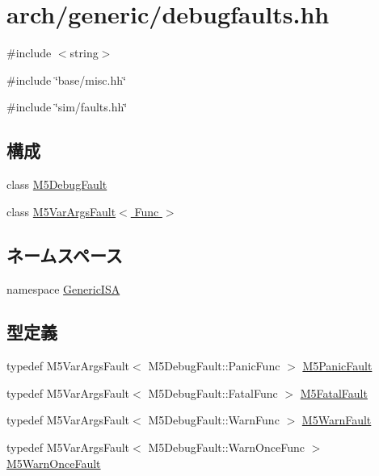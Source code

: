 \hypertarget{debugfaults_8hh}{
\section{arch/generic/debugfaults.hh}
\label{debugfaults_8hh}
}
{\ttfamily \#include $<$string$>$}\par
{\ttfamily \#include \char`\"{}base/misc.hh\char`\"{}}\par
{\ttfamily \#include \char`\"{}sim/faults.hh\char`\"{}}\par
\subsection*{構成}
\begin{DoxyCompactItemize}
\item 
class \hyperlink{classGenericISA_1_1M5DebugFault}{M5DebugFault}
\item 
class \hyperlink{classGenericISA_1_1M5VarArgsFault}{M5VarArgsFault$<$ Func $>$}
\end{DoxyCompactItemize}
\subsection*{ネームスペース}
\begin{DoxyCompactItemize}
\item 
namespace \hyperlink{namespaceGenericISA}{GenericISA}
\end{DoxyCompactItemize}
\subsection*{型定義}
\begin{DoxyCompactItemize}
\item 
typedef M5VarArgsFault$<$ M5DebugFault::PanicFunc $>$ \hyperlink{namespaceGenericISA_a3427cc78f489a7ee730b871fcb4c1960}{M5PanicFault}
\item 
typedef M5VarArgsFault$<$ M5DebugFault::FatalFunc $>$ \hyperlink{namespaceGenericISA_a7eadd3e78154f25c430d19d74ac7eb0c}{M5FatalFault}
\item 
typedef M5VarArgsFault$<$ M5DebugFault::WarnFunc $>$ \hyperlink{namespaceGenericISA_ad2999c164328ac8e86d95c538d694132}{M5WarnFault}
\item 
typedef M5VarArgsFault$<$ M5DebugFault::WarnOnceFunc $>$ \hyperlink{namespaceGenericISA_ae33236ed5f8a96d7a8c02ad15024384a}{M5WarnOnceFault}
\end{DoxyCompactItemize}
